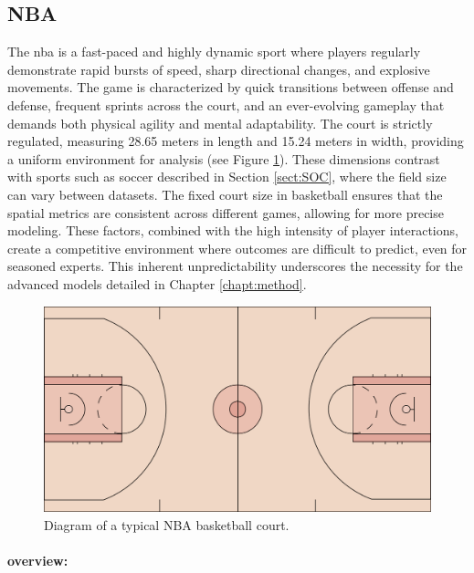 \subsection{NBA}
\label{sect:NBA}
The \gls{nba} is a fast-paced and highly dynamic sport where players regularly demonstrate rapid bursts of speed, sharp directional changes, and explosive movements. The game is characterized by quick transitions between offense and defense, frequent sprints across the court, and an ever-evolving gameplay that demands both physical agility and mental adaptability. The court is strictly regulated, measuring 28.65 meters in length and 15.24 meters in width, providing a uniform environment for analysis (see Figure \ref{fig:nba_court}). These dimensions contrast with sports such as soccer described in Section \ref{sect:SOC}, where the field size can vary between datasets. The fixed court size in basketball ensures that the spatial metrics are consistent across different games, allowing for more precise modeling. These factors, combined with the high intensity of player interactions, create a competitive environment where outcomes are difficult to predict, even for seasoned experts. This inherent unpredictability underscores the necessity for the advanced models detailed in Chapter \ref{chapt:method}.

\begin{figure}[t]
    \centering
    \includegraphics[width=\textwidth]{contents/nba_court.png}
    \caption{Diagram of a typical NBA basketball court.}
    \label{fig:nba_court}
\end{figure}

\paragraph {overview:}
\label{sect:original_nba}

